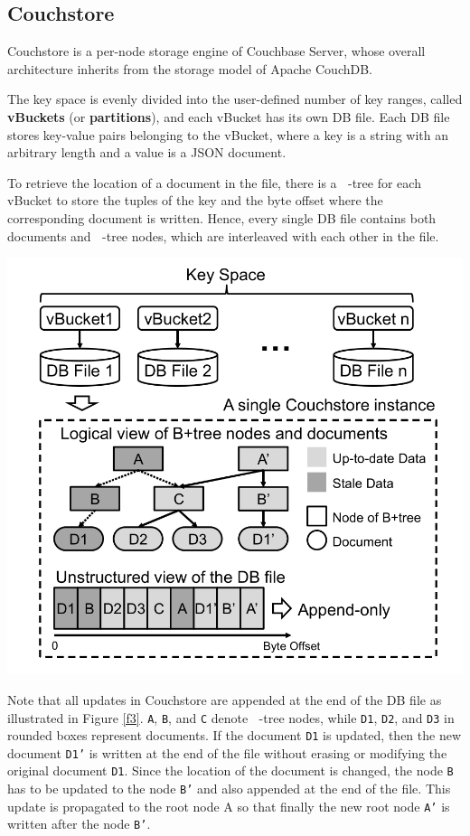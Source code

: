 \documentclass[11pt]{article}
\DeclareMathOperator{\BP}{\text{B}^+}
\begin{document}
\subsection{Couchstore}
\label{sec:org0203c74}
Couchstore is a per-node storage engine of Couchbase Server, whose overall architecture inherits from
the storage model of Apache CouchDB.

The key space is evenly divided into the user-defined number of
key ranges, called \textbf{vBuckets} (or \textbf{partitions}), and each vBucket has its own DB file. Each DB file stores
key-value pairs belonging to the vBucket, where a key is a string with an arbitrary length and a value
is a JSON document.

To retrieve the location of a document in the file, there is a \(\BP\)-tree for each vBucket to store
the tuples of the key and the byte offset where the corresponding document is written. Hence, every
single DB file contains both documents and \(\BP\)-tree nodes, which are interleaved with each other
in the file.

\begin{center}
\includegraphics[width=.7\textwidth]{../../images/papers/145.png}
\end{center}

Note that all updates in Couchstore are appended at the end of the DB file as illustrated in Figure \ref{f3}.
\texttt{A}, \texttt{B}, and \texttt{C} denote \(\BP\)-tree nodes, while \texttt{D1}, \texttt{D2}, and \texttt{D3} in rounded boxes represent documents. If
the document \texttt{D1} is updated, then the new document \texttt{D1'} is written at the end of the file without
erasing or modifying the original document \texttt{D1}. Since the location of the document is changed, the node
\texttt{B} has to be updated to the node \texttt{B'} and also appended at the end of the file. This update is propagated
to the root node A so that finally the new root node \texttt{A'} is written after the node \texttt{B'}.
\end{document}
